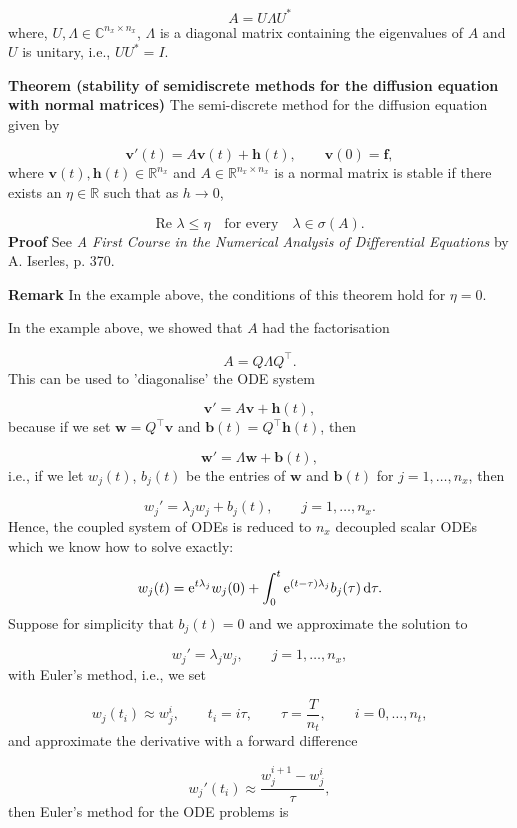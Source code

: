 \documentclass[12pt,landscape]{article}
\begin{document}
{\[
A = U \Lambda U^*
\]
where, $U, \Lambda \in \mathbb{C}^{n_x \times n_x}$, $\Lambda$ is a diagonal matrix containing the eigenvalues of $A$ and $U$ is unitary, i.e., $UU^* = I$.

\textbf{Theorem (stability of semidiscrete methods for the diffusion equation with normal matrices)} The semi-discrete method for the diffusion equation given by  

\[
\mathbf{v}'(t) = A\mathbf{v}(t) + \mathbf{h}(t), \qquad \mathbf{v}(0) = \mathbf{f}, 
\]
where $\mathbf{v}(t), \mathbf{h}(t) \in \mathbb{R}^{n_x}$ and  $A \in \mathbb{R}^{n_x \times n_x}$ is a normal matrix is stable if there exists an $\eta \in \mathbb{R}$ such that as $h \to 0$,

\[
\text{Re } \lambda \leq \eta \quad \text{for every} \quad \lambda \in \sigma(A).
\]
\textbf{Proof}  See \emph{A First Course in the Numerical Analysis of Differential Equations} by A. Iserles, p. 370.

\textbf{Remark} In the example above, the conditions of this theorem hold for $\eta = 0$.

In the example above, we showed that $A$ had the factorisation

\[
A = Q\Lambda Q^{\top}.
\]
This can be used to 'diagonalise' the ODE system

\[
\mathbf{v}' = A\mathbf{v} + \mathbf{h}(t),
\]
because if we set $\mathbf{w} = Q^{\top}\mathbf{v}$ and $\mathbf{b}(t) = Q^{\top}\mathbf{h}(t)$, then

\[
\mathbf{w}' = \Lambda \mathbf{w} + \mathbf{b}(t), 
\]
i.e., if we let $w_j(t)$, $b_j(t)$ be the entries of $\mathbf{w}$ and $\mathbf{b}(t)$ for $j = 1, \ldots, n_x$, then

\[
w_j' = \lambda_j w_j + b_j(t), \qquad j = 1, \ldots, n_x.
\]
Hence, the coupled system of ODEs is reduced to $n_x$ decoupled scalar ODEs which we know how to solve exactly:

\[
w_j(t) = {\rm e}^{t\lambda_j}w_j(0) + \int_0^t {\rm e}^{(t - \tau)\lambda_j}b_j(\tau)\,{\rm d}\tau.
\]
Suppose for simplicity that $b_j(t) = 0$ and we approximate the solution to 

\[
w_j' = \lambda_j w_j, \qquad j = 1, \ldots, n_x,
\]
with Euler's method, i.e., we set

\[
w_j(t_i) \approx w_j^i, \qquad t_i = i\tau, \qquad \tau = \frac{T}{n_t}, \qquad i = 0, \ldots, n_t,
\]
and approximate the derivative with a forward difference

\[
w_j'(t_i) \approx \frac{w^{i+1}_j - w^i_j}{\tau},
\]
then Euler's method for the ODE problems is

}
\end{document}
